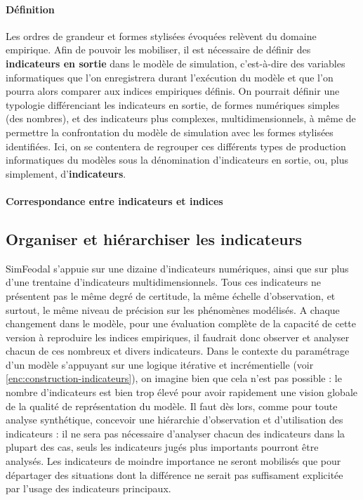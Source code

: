 \paragraph{Définition}
Les ordres de grandeur et formes stylisées évoquées relèvent du domaine empirique. Afin de pouvoir les mobiliser, il est nécessaire de définir des \textbf{indicateurs en sortie} dans le modèle de simulation, c'est-à-dire des variables informatiques que l'on enregistrera durant l'exécution du modèle et que l'on pourra alors comparer aux indices empiriques définis. On pourrait définir une typologie différenciant les indicateurs en sortie, de formes numériques simples (des nombres), et des indicateurs plus complexes, multidimensionnels, à même de permettre la confrontation du modèle de simulation avec les formes stylisées identifiées. Ici, on se contentera de regrouper ces différents types de production informatiques du modèles sous la dénomination d'\og indicateurs en sortie\fg{}, ou, plus simplement, d'\textbf{indicateurs}.

\paragraph{Correspondance entre indicateurs et indices}

\subsection{Organiser et hiérarchiser les indicateurs}

SimFeodal s'appuie sur une dizaine d'indicateurs numériques, ainsi que sur plus d'une trentaine d'indicateurs multidimensionnels. Tous ces indicateurs ne présentent pas le même degré de certitude, la même échelle d'observation, et surtout, le même niveau de précision sur les phénomènes modélisés. A chaque changement dans le modèle, pour une évaluation complète de la capacité de cette version à reproduire les indices empiriques, il faudrait donc observer et analyser chacun de ces nombreux et divers indicateurs. Dans le contexte du paramétrage d'un modèle s'appuyant sur une logique itérative et incrémentielle (voir \cref{enc:construction-indicateurs}), on imagine bien que cela n'est pas possible : le nombre d'indicateurs est bien trop élevé pour avoir rapidement une vision globale de la qualité de représentation du modèle. Il faut dès lors, comme pour toute analyse synthétique, concevoir une hiérarchie d'observation et d'utilisation des indicateurs : il ne sera pas nécessaire d'analyser chacun des indicateurs dans la plupart des cas, seuls les indicateurs jugés plus importants pourront être analysés. Les indicateurs de moindre importance ne seront mobilisés que pour départager des situations dont la différence ne serait pas suffisament explicitée par l'usage des indicateurs principaux.


